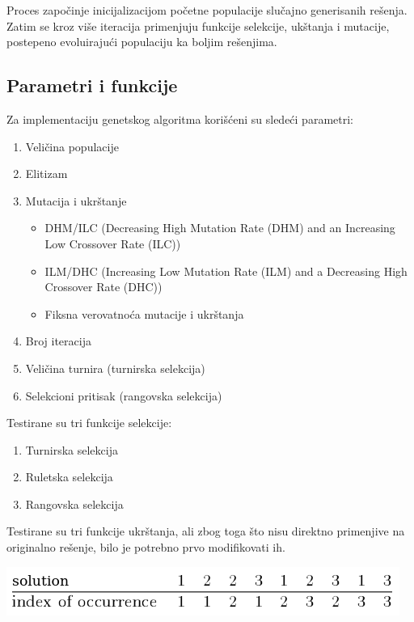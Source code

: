 \documentclass[12pt, a4paper]{article}
\begin{document}
Proces započinje inicijalizacijom početne populacije slučajno generisanih rešenja. Zatim se kroz više iteracija primenjuju funkcije selekcije, ukštanja i mutacije, postepeno evoluirajući populaciju ka boljim rešenjima.

\subsection{Parametri i funkcije}
Za implementaciju genetskog algoritma korišćeni su sledeći parametri:
\begin{enumerate}
	\item Veličina populacije
	\item Elitizam
	\item Mutacija i ukrštanje
		\begin{itemize}
			\item DHM/ILC (Decreasing High Mutation Rate (DHM) and an Increasing Low Crossover Rate (ILC))
			\item ILM/DHC (Increasing Low Mutation Rate (ILM) and a Decreasing High Crossover Rate (DHC))
			\item Fiksna verovatnoća mutacije i ukrštanja
		\end{itemize}
	\item Broj iteracija
	\item Veličina turnira (turnirska selekcija)
	\item Selekcioni pritisak (rangovska selekcija) \\
\end{enumerate}

Testirane su tri funkcije selekcije:
\begin{enumerate}
	\item Turnirska selekcija
	\item Ruletska selekcija
	\item Rangovska selekcija \\
\end{enumerate}

Testirane su tri funkcije ukrštanja, ali zbog toga što nisu direktno primenjive na originalno rešenje, bilo je potrebno prvo modifikovati ih.

\vspace{0.5cm}
\begin{center}
  \includegraphics[width=0.8\linewidth]{img/modifikacija_resenja.png}
\end{center}
\vspace{0.5cm}
\end{document}
